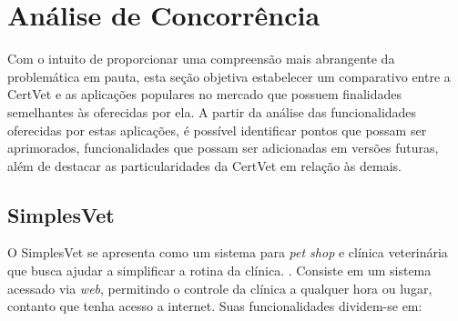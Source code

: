 \documentclass[
    12pt,               %
    openright,          %
    oneside,
    a4paper,            %
    BIBLATEX,           %
    TODO,               %
    english,            %
    brazil              %
    ]{ifsp-spo-inf-ctds}
\begin{document}
    \section{Análise de Concorrência} \label{analise_concorrência}

    
    Com o intuito de proporcionar uma compreensão mais abrangente da problemática em pauta, esta seção objetiva estabelecer um comparativo entre a CertVet e as aplicações populares no mercado que possuem finalidades semelhantes às oferecidas por ela. A partir da análise das funcionalidades oferecidas por estas aplicações, é possível identificar pontos que possam ser aprimorados, funcionalidades que possam ser adicionadas em versões futuras, além de destacar as particularidades da CertVet em relação às demais.

    \subsection{SimplesVet}
    O SimplesVet se apresenta como um sistema para \emph{pet shop} e clínica veterinária que busca ajudar a simplificar a rotina da clínica. . Consiste em um sistema acessado via \emph{web}, permitindo o controle da clínica a qualquer hora ou lugar, contanto que tenha acesso a internet. Suas funcionalidades dividem-se em:
\end{document}
